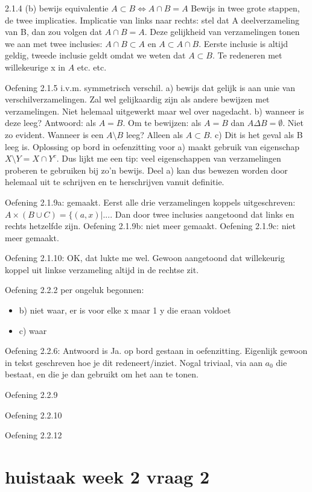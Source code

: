 \documentclass{article}
\begin{document}
2.1.4 (b) bewijs equivalentie 
$ A \subset B \Leftrightarrow A \cap B = A$
Bewijs in twee grote stappen, de twee implicaties. Implicatie van links naar rechts: stel dat A deelverzameling van B, dan zou volgen dat $A \cap B = A$. Deze gelijkheid van verzamelingen tonen we aan met twee inclusies: $A \cap B \subset A$ en $A \subset A \cap B $. 
Eerste inclusie is altijd geldig, tweede inclusie geldt omdat we weten dat $ A \subset B$. Te redeneren met willekeurige x in $A$ etc. etc. 

Oefening 2.1.5 i.v.m. symmetrisch verschil. a) bewijs dat gelijk is aan unie van verschilverzamelingen. Zal wel gelijkaardig zijn als andere bewijzen met verzamelingen. Niet helemaal uitgewerkt maar wel over nagedacht. b) wanneer is deze leeg? Antwoord: als $A=B$. Om te bewijzen: als $A=B$ dan $A \Delta B = \emptyset$. Niet zo evident. Wanneer is een $A \setminus B $ leeg? Alleen als $A \subset B$. 
c) Dit is het geval als B leeg is. 
Oplossing op bord in oefenzitting voor a) maakt gebruik van eigenschap $X \setminus Y = X \cap Y^c$. Dus lijkt me een tip: veel eigenschappen van verzamelingen proberen te gebruiken bij zo'n bewijs. Deel a) kan dus bewezen worden door helemaal uit te schrijven en te herschrijven vanuit definitie. 


Oefening 2.1.9a: gemaakt. Eerst alle drie verzamelingen koppels uitgeschreven: $A \times (B \cup C) = \{ (a,x) | ...$. Dan door twee inclusies aangetoond dat links en rechts hetzelfde zijn. 
Oefening 2.1.9b: niet meer gemaakt. 
Oefening 2.1.9c: niet meer gemaakt. 

Oefening 2.1.10: OK, dat lukte me wel. Gewoon aangetoond dat willekeurig koppel uit linkse verzameling altijd in de rechtse zit. 

Oefening 2.2.2 per ongeluk begonnen:
\begin{itemize}
    \item b) niet waar, er is voor elke x maar 1 y die eraan voldoet
    \item c) waar
\end{itemize}

Oefening 2.2.6: Antwoord is Ja. op bord gestaan in oefenzitting. Eigenlijk gewoon in tekst geschreven hoe je dit redeneert/inziet. Nogal triviaal, via aan $a_0$ die bestaat, en die je dan gebruikt om het aan te tonen. 


Oefening 2.2.9

Oefening 2.2.10

Oefening 2.2.12


\section{huistaak week 2 vraag 2}
\end{document}
